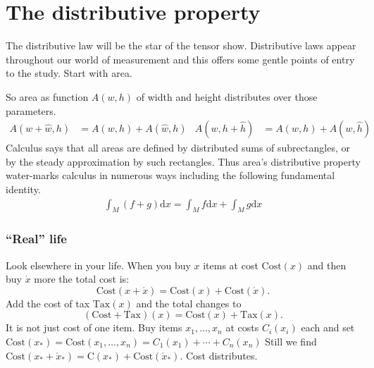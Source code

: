 
\chapter{The distributive property}

The distributive law will be the star of the tensor show.   Distributive laws
appear throughout our world of measurement and this offers some gentle points 
of entry to the study.  
Start with area.
\begin{center}
\hspace{1in}
\end{center}
So area as  function $A(w,h)$ of width and height distributes over those parameters.
\begin{align*}
    A(w+\hat{w},h) &= A(w,h)+A(\hat{w},h)
    &    A(w,h+\hat{h}) &= A(w,h)+A(w,\hat{h})
\end{align*}
Calculus says that all areas are defined by distributed sums 
of subrectangles, or by the steady approximation by such rectangles.
Thus area's distributive property water-marks calculus 
in numerous ways including the following fundamental identity.
\begin{align*}
    \int_M (f+g)\text{d}x = \int_M f \text{d}x + \int_M g \text{d}x
\end{align*}

\subsection{``Real'' life}
Look elsewhere in your life.  When you buy $x$ items at cost $\text{Cost}(x)$
and then buy $\acute{x}$ more the total cost is:
\[
    \text{Cost}(x+\acute{x})=\text{Cost}(x)+\text{Cost}(\acute{x}).
\]  
Add the cost of tax $\text{Tax}(x)$ and the total changes to 
\[
    (\text{Cost}+\text{Tax})(x)=\text{Cost}(x)+\text{Tax}(x).
\]
It is not just cost of one item.  Buy items $x_1,\ldots, x_n$ at 
costs $C_i(x_i)$ each and set 
\(
    \text{Cost}(x_*)=\text{Cost}(x_1,\ldots,x_n) = C_1(x_1)+\cdots +C_n(x_n)
\)
Still we find
$\text{Cost}(x_*+\acute{x}_*)=\text{C}(x_*)+\text{Cost}(\acute{x}_*)$.
Cost distributes.  

